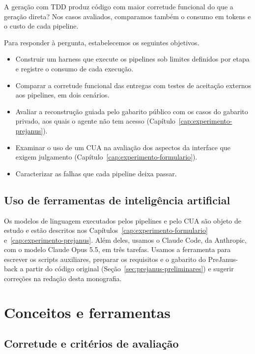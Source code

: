 \documentclass[a4paper,12pt,twoside,english,brazilian]{book}
\begin{document}
A geração com TDD produz código com maior corretude funcional do que a geração
direta? Nos casos avaliados, comparamos também o consumo em tokens e o custo
de cada pipeline.

Para responder à pergunta, estabelecemos os seguintes objetivos.
\begin{itemize}
  \item Construir um harness que execute os pipelines sob limites definidos por
    etapa e registre o consumo de cada execução.
  \item Comparar a corretude funcional das entregas com testes de aceitação
    externos aos pipelines, em dois cenários.
  \item Avaliar a reconstrução guiada pelo gabarito público com os casos do
    gabarito privado, aos quais o agente não tem acesso
    (Capítulo~\ref{cap:experimento-prejanus}).
  \item Examinar o uso de um CUA na avaliação dos aspectos da interface que
    exigem julgamento (Capítulo~\ref{cap:experimento-formulario}).
  \item Caracterizar as falhas que cada pipeline deixa passar.
\end{itemize}

\section{Uso de ferramentas de inteligência artificial}
\label{sec:uso-ia}

Os modelos de linguagem executados pelos pipelines e pelo CUA são objeto de
estudo e estão descritos nos Capítulos~\ref{cap:experimento-formulario}
e~\ref{cap:experimento-prejanus}. Além deles, usamos o Claude Code, da
Anthropic, com o modelo Claude Opus 5.5, em três tarefas. Usamos a ferramenta
para escrever os scripts auxiliares, preparar os requisitos e o gabarito do
PreJanus-back a partir do código original (Seção~\ref{sec:prejanus-preliminares})
e sugerir correções na redação desta monografia.

\chapter{Conceitos e ferramentas}
\label{cap:ferramentas}

\section{Corretude e critérios de avaliação}
\label{sec:corretude}
\end{document}

